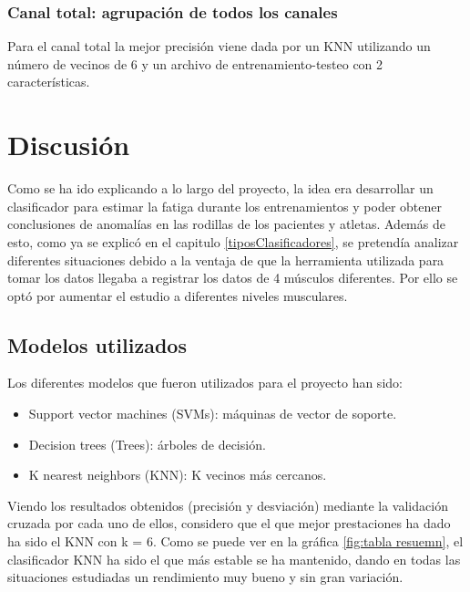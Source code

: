 \subsubsection{Canal total: agrupación de todos los canales }
Para el canal total la mejor precisión viene dada por un KNN utilizando un número de vecinos de 6 y un archivo de entrenamiento-testeo con 2 características.






\section{Discusión}
Como se ha ido explicando a lo largo del proyecto, la idea era desarrollar un clasificador para estimar la fatiga durante los entrenamientos y poder obtener conclusiones de anomalías en las rodillas de los pacientes y atletas. Además de esto, como ya se explicó en el capitulo \ref{tiposClasificadores}, se pretendía analizar diferentes situaciones debido a la ventaja de que la herramienta utilizada para tomar los datos llegaba a registrar los datos de 4 músculos diferentes. Por ello se optó por aumentar el estudio a diferentes niveles musculares.



\subsection{Modelos utilizados}
Los diferentes modelos que fueron utilizados para el proyecto han sido:
\begin{itemize}
\item Support vector machines (SVMs): máquinas de vector de soporte.
\item Decision trees (Trees): árboles de decisión.
\item K nearest neighbors (KNN): K vecinos más cercanos.
\end{itemize}

Viendo los resultados obtenidos (precisión y desviación) mediante la validación cruzada por cada uno de ellos, considero que el que mejor prestaciones ha dado ha sido el KNN con k = 6. Como se puede ver en la gráfica \ref{fig:tabla resuemn}, el clasificador KNN ha sido el que más estable se ha mantenido, dando en todas las situaciones estudiadas un rendimiento muy bueno y sin gran variación.

